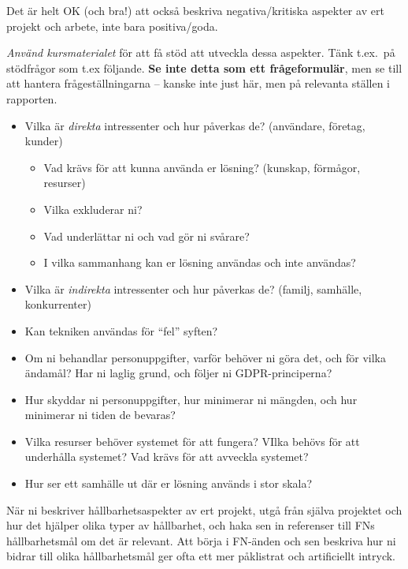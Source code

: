 Det är helt OK (och bra!) att också beskriva negativa/kritiska aspekter av ert projekt och arbete, inte bara positiva/goda. 

\emph{Använd kursmaterialet} för att få stöd att utveckla dessa aspekter.
Tänk t.ex.~på stödfrågor som t.ex följande. \textbf{Se inte detta som ett frågeformulär}, men se till att hantera frågeställningarna -- kanske inte just här, men på relevanta ställen i rapporten.
\begin{itemize}
\item Vilka är \emph{direkta} intressenter och hur påverkas de? (användare, företag, kunder)
\begin{itemize}
\item  Vad krävs för att kunna använda er lösning? (kunskap, förmågor, resurser)
\item  Vilka exkluderar ni?
\item  Vad underlättar ni och vad gör ni svårare?
\item  I vilka sammanhang kan er lösning användas och inte användas?
\end{itemize}
\item  Vilka är \emph{indirekta} intressenter och hur påverkas de? (familj, samhälle, konkurrenter)
\item  Kan tekniken användas för ``fel'' syften?
\item Om ni behandlar personuppgifter, varför behöver ni göra det, och för vilka ändamål? Har ni laglig grund, och följer ni GDPR-principerna?
\item Hur skyddar ni personuppgifter, hur minimerar ni mängden, och hur minimerar ni tiden de bevaras?
\item Vilka resurser behöver systemet för att fungera? VIlka behövs för att underhålla systemet? Vad krävs för att avveckla systemet?
\item  Hur ser ett samhälle ut där er lösning används i stor skala?
\end{itemize}

När ni beskriver hållbarhetsaspekter av ert projekt, utgå från själva projektet och hur det hjälper olika typer av hållbarhet, och haka sen in referenser till FNs hållbarhetsmål om det är relevant. Att börja i FN-änden och sen beskriva hur ni bidrar till olika hållbarhetsmål ger ofta ett mer påklistrat och artificiellt intryck.


